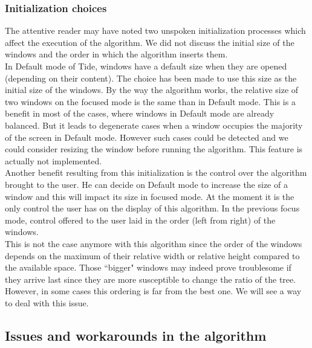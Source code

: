 \documentclass{acmtog}
\begin{document}
\subsubsection{Initialization choices}

The attentive reader may have noted two unspoken initialization processes which affect the execution of the algorithm. We did not discuss the initial size of the windows and the order in which the algorithm inserts them. \\
In Default mode of Tide, windows have a default size when they are opened (depending on their content). The choice has been made to use this size as the initial size of the windows. By the way the algorithm works, the relative size of two windows on the focused mode is the same than in Default mode. This is a benefit in most of the cases, where windows in Default mode are already balanced. But it leads to degenerate cases when a window occupies the majority of the screen in Default mode. However
such cases could be detected and we could consider resizing the window before running the algorithm. This feature is actually not implemented. \\
Another benefit resulting from this initialization is the control over the algorithm brought to the user. He can decide on Default mode to increase the size of a window and this will impact its size in focused mode. At the moment it is the only control the user has on the display of this algorithm. In the previous focus mode, control offered to the user laid in the order (left from right) of the windows. \\
This is not the case anymore with this algorithm since the order of the windows depends on the maximum of their relative width or relative height compared to the available space. Those ``bigger" windows may indeed prove troublesome if they arrive last since they are more susceptible to change the ratio of the tree. However, in some cases this ordering is far from the best one. We will see a way to deal with this issue.

\subsection{Issues and workarounds in the algorithm}
\end{document}
